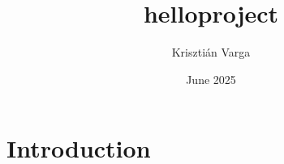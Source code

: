 \documentclass{article}
\title{helloproject}
\author{Krisztián Varga}
\date{June 2025}
\begin{document}
\maketitle

\section{Introduction}
\end{document}

